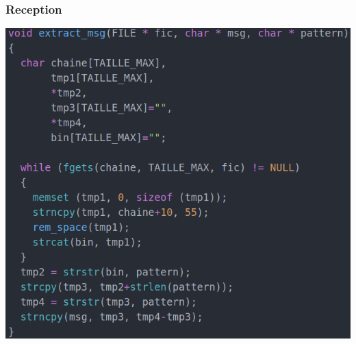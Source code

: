 \begin{frame}
\frametitle{Reception}
\centering \includegraphics[scale=0.38]{images/extract_message.png}
\end{frame}